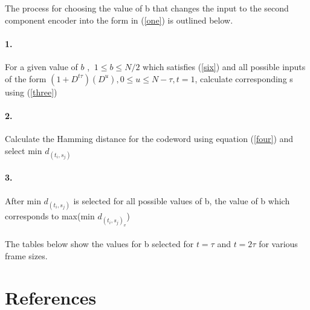 \documentclass[20 pts]{article}
\begin{document}
The process for choosing the value of b that changes the input to the second 
component encoder into the form in (\ref{one}) is outlined below.

\paragraph{1.} For a given value of $b$ , $\ 1 \leq b \leq N/2$ which 
satisfies (\ref{six}) and all possible inputs of the form $(1+D^{t\tau})(D^u) ,0\leq u\leq N-\tau, t=1$, 
calculate corresponding s using (\ref{three})
\paragraph{2.} Calculate the Hamming distance for the codeword using
 equation (\ref{four}) and select min $d_{(t_i,s_j)}$
\paragraph{3.}After min $d_{(t_i,s_j)}$ is selected for all possible values of b,
 the value of b which corresponds to max(min $d_{(t_i,s_j)_v}$)

\paragraph{}
The tables below show the values for b selected for $t=\tau$ and $t=2\tau$ for 
various frame sizes.
               


    
\section{References}
\end{document}
